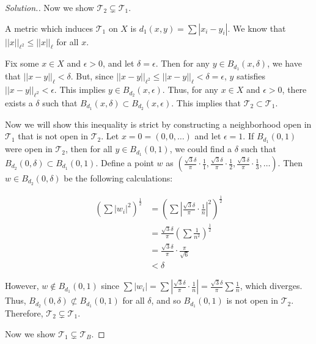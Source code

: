 \documentclass{article}
\newcommand{\T}{\mathcal{T}}
\newcommand{\sk}{\smallskip}
\begin{document}
\begin{enumerate}
\begin{proof}[Solution.]
    \sk

    Now we show $\T_2 \subsetneq \T_1$. 

    \sk
    A metric which induces $\T_1$ on $X$ is $d_1(x, y) = \sum |x_i - y_i|$. We know that $||x||_{\ell^2} \leq ||x||_{\ell}$ for all $x$. 

    \sk

    Fix some $x \in X$ and $\epsilon > 0$, and let $\delta = \epsilon$. Then for any $y \in B_{d_1}(x, \delta)$, we have that $||x - y||_{\ell} < \delta$. But, since $||x - y||_{\ell^2} \leq ||x - y||_{\ell} < \delta = \epsilon$, $y$ satisfies $||x - y||_{\ell^2} < \epsilon$. This implies $y \in B_{d_2}(x, \epsilon)$. Thus, for any $x \in X$ and $\epsilon > 0$, there exists a $\delta$ such that $B_{d_1}(x, \delta) \subset B_{d_2}(x, \epsilon)$. This implies that $\T_2 \subset \T_1$. 

    \sk

    Now we will show this inequality is strict by constructing a neighborhood open in $\T_1$ that is not open in $\T_2$. Let $x = 0 = (0, 0, \dots)$ and let $\epsilon = 1$. If $B_{d_1}(0, 1)$ were open in $\T_2$, then for all $y \in B_{d_1}(0, 1)$, we could find a $\delta$ such that $B_{d_2}(0, \delta) \subset B_{d_1}(0, 1)$. Define a point $w$ as $\left(\frac{\sqrt{3}\delta}{\pi}\cdot{\frac{1}{1}}, \frac{\sqrt{3}\delta}{\pi}\cdot{\frac{1}{2}}, \frac{\sqrt{3}\delta}{\pi}\cdot{\frac{1}{3}}, \dots \right)$. Then $w \in B_{d_2}(0, \delta)$ be the following calculations:

    \begin{align*}
        \left(\sum |w_i|^2\right)^\frac{1}{2} &= \left(\sum \left|\frac{\sqrt{3}\delta}{\pi}\cdot{\frac{1}{n}}\right|^2\right)^\frac{1}{2} \\
        &= \frac{\sqrt{3}\delta}{\pi}\left(\sum \frac{1}{n^2}\right)^\frac{1}{2} \\
        &= \frac{\sqrt{3}\delta}{\pi} \cdot \frac{\pi}{\sqrt{6}} \\
        &< \delta
    \end{align*}

    However, $w \notin B_{d_1}(0, 1)$ since $\sum |w_i| = \sum \left|\frac{\sqrt{3}\delta}{\pi} \cdot \frac{1}{n}\right| = \frac{\sqrt{3}\delta}{\pi} \sum \frac{1}{n}$, which diverges. Thus, $B_{d_2}(0, \delta) \not\subset B_{d_1}(0, 1)$ for all $\delta$, and so $B_{d_1}(0, 1)$ is not open in $\T_2$. Therefore, $\T_2 \subsetneq \T_1$. 

    \sk
    
    Now we show $\T_1 \subsetneq \T_B$.


\end{proof}
\end{enumerate}
\end{document}
